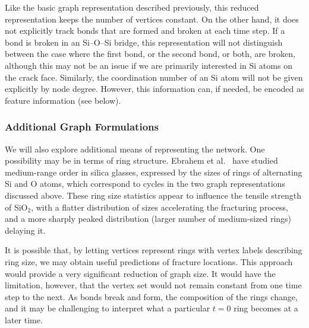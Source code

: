 Like the basic graph representation described previously, this reduced representation keeps the number of vertices constant.  On the other hand, it does not explicitly track bonds that are formed and broken at each time step. If a bond is broken in an Si--O--Si bridge, this representation will not distinguish between the case where the first bond, or the second bond, or both, are broken, although this may not be an issue if we are primarily interested in Si atoms on the crack face.  Similarly, the coordination number of an Si atom will not be given explicitly by node degree.  However, this information can, if needed, be encoded as feature information (see below).

\subsubsection{Additional Graph Formulations}

We will also explore additional means of representing the network.  One possibility may be in terms of ring structure.  Ebrahem et al.~\cite{ebrahem2018influence} have studied medium-range order in silica glasses, expressed by the sizes of rings of alternating Si and O atoms, which correspond to cycles in the two graph representations discussed above.  These ring size statistics appear to influence the tensile strength of SiO$_2$, with a flatter distribution of sizes accelerating the fracturing process, and a more sharply peaked distribution (larger number of medium-sized rings) delaying it.

It is possible that, by letting vertices represent rings with vertex labels describing ring size, we may obtain useful predictions of fracture locations. This approach would provide a very significant reduction of graph size.  It would have the limitation, however, that the vertex set would not remain constant from one time step to the next.  As bonds break and form, the composition of the rings change, and it may be challenging to interpret what a particular $t=0$ ring becomes at a later time.



